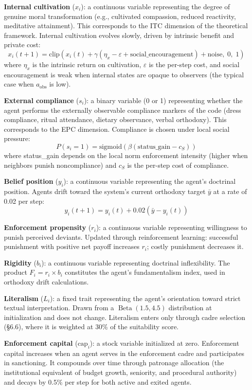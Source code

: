 \documentclass[12pt]{article}
\begin{document}
\textbf{Internal cultivation} ($x_i$): a continuous variable representing the degree of genuine moral transformation (e.g., cultivated compassion, reduced reactivity, meditative attainment). This corresponds to the ITC dimension of the theoretical framework. Internal cultivation evolves slowly, driven by intrinsic benefit and private cost:
\[
x_i(t+1) = \text{clip}(x_i(t) + \gamma(\eta_x - \varepsilon + \text{social\_encouragement}) + \text{noise},\; 0,\; 1)
\]
where $\eta_x$ is the intrinsic return on cultivation, $\varepsilon$ is the per-step cost, and social encouragement is weak when internal states are opaque to observers (the typical case when $a_{\text{obs}}$ is low).

\textbf{External compliance} ($s_i$): a binary variable (0 or 1) representing whether the agent performs the externally observable compliance markers of the code (dress compliance, ritual attendance, dietary observance, verbal orthodoxy). This corresponds to the EPC dimension. Compliance is chosen under local social pressure:
\[
P(s_i = 1) = \text{sigmoid}(\beta(\text{status\_gain} - c_S))
\]
where status\_gain depends on the local norm enforcement intensity (higher when neighbors punish noncompliance) and $c_S$ is the per-step cost of compliance.

\textbf{Belief position} ($y_i$): a continuous variable representing the agent's doctrinal position. Agents drift toward the system's current orthodoxy target $\bar{y}$ at a rate of 0.02 per step:
\[
y_i(t+1) = y_i(t) + 0.02(\bar{y} - y_i(t))
\]

\textbf{Enforcement propensity} ($r_i$): a continuous variable representing willingness to punish perceived deviants. Updated through reinforcement learning: successful punishment with positive net payoff increases $r_i$; costly punishment decreases it.

\textbf{Rigidity} ($b_i$): a continuous variable representing doctrinal inflexibility. The product $F_i = r_i \times b_i$ constitutes the agent's fundamentalism index, used in orthodoxy drift calculations.

\textbf{Literalism} ($L_i$): a fixed trait representing the agent's orientation toward strict textual interpretation. Drawn from a $\operatorname{Beta}(1.5,4.5)$ distribution at initialization and does not change. Literalism enters only through cadre selection (\S6.6), where it is weighted at 30\% of the suitability score.

\textbf{Enforcement capital} ($\text{cap}_i$): a stock variable initialized at zero. Enforcement capital increases when an agent serves in the enforcement cadre and participates in sanctioning. It compounds over time through patronage allocation (the institutional equivalent of budget growth, seniority, and procedural authority) and decays by 0.5\% per step for both active and exited agents.
\end{document}
